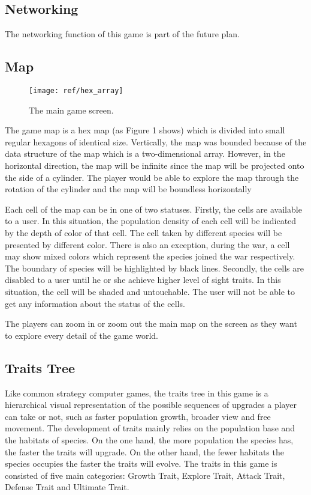 \documentclass[12pt,a4paper]{article}
\begin{document}
	\subsection{Networking}
	The networking function of this game is part of the future plan.
	\subsection{Map}
	\begin{figure}[h!]
	\begin{center}
	\texttt{[image: ref/hex\_array]}
	\caption{The main game screen.}
	\end{center}
	\end{figure}
	The game map is a hex map (as Figure 1 shows) which is divided into small regular hexagons of identical size. Vertically, the map was bounded because of the data structure of the map which is a two-dimensional array. However, in the horizontal direction, the map will be infinite since the map will be projected onto the side of a cylinder. The player would be able to explore the map through the rotation of the cylinder and the map will be boundless horizontally

	Each cell of the map can be in one of two statuses. Firstly, the cells are available to a user. In this situation, the population density of each cell will be indicated by the depth of color of that cell. The cell taken by different species will be presented by different color. There is also an exception, during the war, a cell may show mixed colors which represent the species joined the war respectively. The boundary of species will be highlighted by black lines. Secondly, the cells are disabled to a user until he or she achieve higher level of sight traits. In this situation, the cell will be shaded and untouchable. The user will not be able to get any information about the status of the cells.
	
	The players can zoom in or zoom out the main map on the screen as they want to explore every detail of the game world.
	\subsection{Traits Tree}
	Like common strategy computer games, the traits tree in this game is a hierarchical visual representation of the possible sequences of upgrades a player can take or not, such as faster population growth, broader view and free movement. The development of traits mainly relies on the population base and the habitats of species. On the one hand, the more population the species has, the faster the traits will upgrade. On the other hand, the fewer habitats the species occupies the faster the traits will evolve. The traits in this game is consisted of five main categories: Growth Trait, Explore Trait, Attack Trait, Defense Trait and Ultimate Trait.
	
\end{document}
